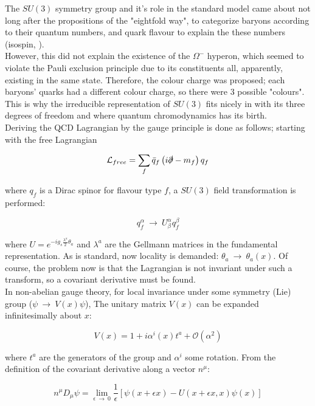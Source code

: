 \documentclass[11pt,a4paper]{article}
\begin{document}
The $SU(3)$ symmetry group and it's role in the standard model came about not long after the propositions of the "eightfold way", to categorize baryons according to their quantum numbers, and quark flavour to explain the these numbers (isospin, ).\\
However, this did not explain the existence of the $\Omega^-$ hyperon, which seemed to violate the Pauli exclusion principle due to its constituents all, apparently, existing in the same state. Therefore, the colour charge was proposed; each baryons' quarks had a different colour charge, so there were 3 possible "colours". This is why the irreducible representation of $SU(3)$ fits nicely in with its three degrees of freedom and where quantum chromodynamics has its birth.\\

Deriving the QCD Lagrangian by the gauge principle is done as follows; starting with the free Lagrangian

\begin{equation}
	\mathcal{L}_{free} = \sum_f \bar{q}_f\left(i\slashed \partial - m_f\right)q_f
\end{equation}

where $q_f$ is a Dirac spinor for flavour type $f$, a $SU(3)$ field transformation is performed:

\begin{equation}
	q_f^\alpha \:\rightarrow\: U^\alpha_\beta q_f^\beta
\end{equation} 

where $U = e^{-ig_s\frac{\lambda^a}{2}\theta_a}$ and $\lambda^a$ are the Gellmann matrices in the fundamental representation. As is standard, now locality is demanded: $\theta_a \:\rightarrow\: \theta_a(x)$. Of course, the problem now is that the Lagrangian is not invariant under such a transform, so a covariant derivative must be found.\\
In non-abelian gauge theory, for local invariance under some symmetry (Lie) group ($\psi \:\rightarrow\: V(x)\psi$), The unitary matrix $V(x)$ can be expanded infinitesimally about $x$:

\begin{equation}
	V(x) = 1 + i\alpha^i(x)t^a + \mathcal{O}(\alpha^2)
\end{equation}

where $t^a$ are the generators of the group and $\alpha^i$ some rotation. From the definition of the covariant derivative along a vector $n^\mu$:

\begin{equation}
	n^\mu D_\mu\psi = \lim_{\epsilon\:\rightarrow\:0} \frac{1}{\epsilon}\left[\psi(x+\epsilon x) - U(x+\epsilon x,x)\psi(x)\right]
	\label{Def_of_D}
\end{equation}
\end{document}
